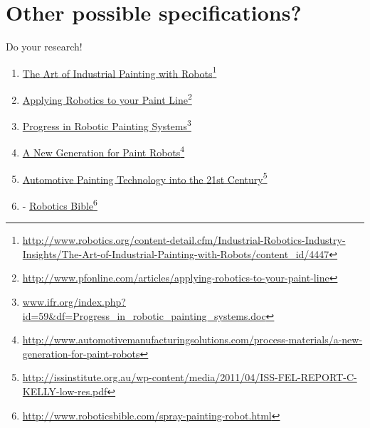 \documentclass[a4paper,10pt]{article}
\newcommand\fnurl[2]{%
  \href{#1}{#2}\footnote{\url{#1}}%
}
\begin{document}
\section{Other possible specifications?}
Do your research! \\
\begin{multicols}{2}
\begin{enumerate}
  \item \fnurl{http://www.robotics.org/content-detail.cfm/Industrial-Robotics-Industry-Insights/The-Art-of-Industrial-Painting-with-Robots/content_id/4447}{The Art of Industrial Painting with Robots} 
  \item \fnurl{http://www.pfonline.com/articles/applying-robotics-to-your-paint-line}{Applying Robotics to your Paint Line} 
  \item \fnurl{www.ifr.org/index.php?id=59&df=Progress_in_robotic_painting_systems.doc}{Progress in Robotic Painting Systems} 
  \item \fnurl{http://www.automotivemanufacturingsolutions.com/process-materials/a-new-generation-for-paint-robots}{A New Generation for Paint Robots} 
  \item \fnurl{http://issinstitute.org.au/wp-content/media/2011/04/ISS-FEL-REPORT-C-KELLY-low-res.pdf}{Automotive Painting Technology into the 21st Century} 
  \item -\fnurl{http://www.roboticsbible.com/spray-painting-robot.html}{Robotics Bible} 
\end{enumerate}
\end{multicols}
\end{document}
